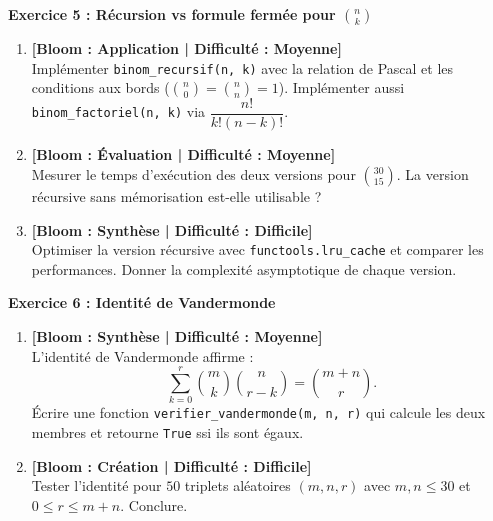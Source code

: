 \documentclass[12pt,a4paper]{report}
\begin{document}
\vspace{0.3cm}

\noindent\textbf{Exercice 5 : Récursion vs formule fermée pour $\binom{n}{k}$}
\begin{enumerate}
    \item \textbf{[Bloom : Application | Difficulté : Moyenne]} \\
    Implémenter \texttt{binom\_recursif(n, k)} avec la relation de Pascal et les conditions aux bords ($\binom{n}{0} = \binom{n}{n} = 1$). Implémenter aussi \texttt{binom\_factoriel(n, k)} via $\dfrac{n!}{k!(n-k)!}$.
    \item \textbf{[Bloom : Évaluation | Difficulté : Moyenne]} \\
    Mesurer le temps d'exécution des deux versions pour $\binom{30}{15}$. La version récursive sans mémorisation est-elle utilisable ?
    \item \textbf{[Bloom : Synthèse | Difficulté : Difficile]} \\
    Optimiser la version récursive avec \texttt{functools.lru\_cache} et comparer les performances. Donner la complexité asymptotique de chaque version.
\end{enumerate}

\vspace{0.3cm}

\noindent\textbf{Exercice 6 : Identité de Vandermonde}
\begin{enumerate}
    \item \textbf{[Bloom : Synthèse | Difficulté : Moyenne]} \\
    L'identité de Vandermonde affirme :
    \[ \sum_{k=0}^{r} \binom{m}{k} \binom{n}{r-k} = \binom{m+n}{r}. \]
    Écrire une fonction \texttt{verifier\_vandermonde(m, n, r)} qui calcule les deux membres et retourne \texttt{True} ssi ils sont égaux.
    \item \textbf{[Bloom : Création | Difficulté : Difficile]} \\
    Tester l'identité pour $50$ triplets aléatoires $(m, n, r)$ avec $m, n \le 30$ et $0 \le r \le m+n$. Conclure.
\end{enumerate}

\vspace{0.3cm}
\end{document}
